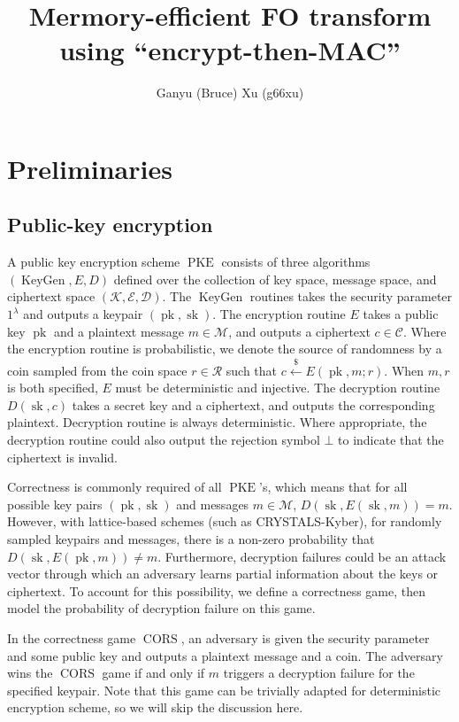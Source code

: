 \documentclass{article}
\title{Mermory-efficient FO transform using ``encrypt-then-MAC''}
\author{Ganyu (Bruce) Xu (g66xu)}
\newcommand{\leftsample}{\overset{{\scriptscriptstyle\$}}{\leftarrow}}
\newcommand{\keygen}{\operatorname{KeyGen}}
\newcommand{\pk}{\operatorname{pk}}
\newcommand{\sk}{\operatorname{sk}}
\newcommand{\pke}{\operatorname{PKE}}
\newcommand{\cors}{\operatorname{CORS}}
\begin{document}
\maketitle

\section{Preliminaries}
\subsection{Public-key encryption}
A public key encryption scheme $\pke$ consists of three algorithms $(\keygen, E, D)$ defined over the collection of key space, message space, and ciphertext space $(\mathcal{K}, \mathcal{E}, \mathcal{D})$. The $\keygen$ routines takes the security parameter $1^\lambda$ and outputs a keypair $(\pk, \sk)$. The encryption routine $E$ takes a public key $\pk$ and a plaintext message $m \in \mathcal{M}$, and outputs a ciphertext $c \in \mathcal{C}$. Where the encryption routine is probabilistic, we denote the source of randomness by a coin sampled from the coin space $r \in \mathcal{R}$ such that $c \leftsample E(\pk, m; r)$. When $m, r$ is both specified, $E$ must be deterministic and injective. The decryption routine $D(\sk, c)$ takes a secret key and a ciphertext, and outputs the corresponding plaintext. Decryption routine is always deterministic. Where appropriate, the decryption routine could also output the rejection symbol $\bot$ to indicate that the ciphertext is invalid.

Correctness is commonly required of all $\pke$'s, which means that for all possible key pairs $(\pk, \sk)$ and messages $m \in \mathcal{M}$, $D(\sk, E(\sk, m)) = m$. However, with lattice-based schemes (such as CRYSTALS-Kyber), for randomly sampled keypairs and messages, there is a non-zero probability that $D(\sk, E(\pk, m)) \neq m$. Furthermore, decryption failures could be an attack vector through which an adversary learns partial information about the keys or ciphertext\cite{bos2018crystals}. To account for this possibility, we define a correctness game, then model the probability of decryption failure on this game.

In the correctness game $\cors$, an adversary is given the security parameter and some public key and outputs a plaintext message and a coin. The adversary wins the $\cors$ game if and only if $m$ triggers a decryption failure for the specified keypair. Note that this game can be trivially adapted for deterministic encryption scheme, so we will skip the discussion here.
\end{document}
